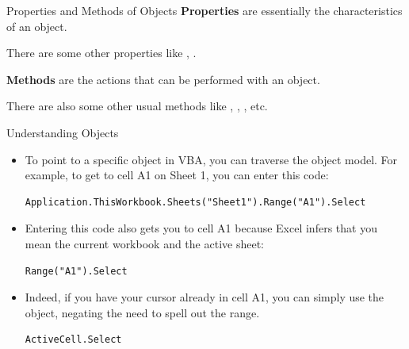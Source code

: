 \documentclass{beamer}
\begin{document}
\begin{frame}{Properties and Methods of Objects}
\textbf{Properties} are essentially the characteristics of an object.
\begin{center}
\end{center}
\vspace{-0.3em}
{\small There are some other properties like , .}

\vspace{0.6em}
\textbf{Methods} are the actions that can be performed with an object.
\begin{center}
\end{center}
\vspace{-0.3em}
{\small There are also some other usual methods like , , , etc.}
\end{frame}

\begin{frame}[fragile]{Understanding Objects}
\begin{itemize}
  \item To point to a specific object in VBA, you can traverse the object model.
        For example, to get to cell A1 on Sheet 1, you can enter this code:
\begin{lstlisting}[language=VBA]
Application.ThisWorkbook.Sheets("Sheet1").Range("A1").Select
\end{lstlisting}
  \item Entering this code also gets you to cell A1 because Excel infers that you mean
        the current workbook and the active sheet:
\begin{lstlisting}[language=VBA]
Range("A1").Select
\end{lstlisting}
  \item Indeed, if you have your cursor already in cell A1, you can simply use the
         object, negating the need to spell out the range.
\begin{lstlisting}[language=VBA]
ActiveCell.Select
\end{lstlisting}
\end{itemize}
\end{frame}
\end{document}
